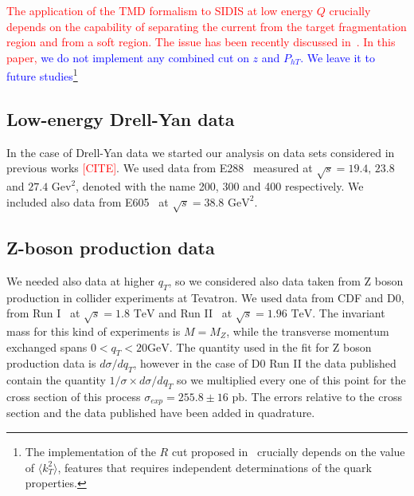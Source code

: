 \documentclass[aps,preprintnumbers,showpacs,nofootinbib,superscriptaddress,floatfix]{revtex4}
\begin{document}
\textcolor{red}{The application of the TMD formalism to SIDIS at low energy $Q$ crucially depends on the capability of separating the current from the target fragmentation region and from a soft region. The issue has been recently discussed in~\cite{Boglione:2016bph}. In this paper, }
\textcolor{blue}{we do not implement any combined cut on $z$ and $P_{hT}$. We leave it to future studies\footnote{The implementation of the $R$ cut proposed in~\cite{Boglione:2016bph} crucially depends on the value of $\langle k_T^2 \rangle$, features that requires independent determinations of the quark properties.}}

\subsection{Low-energy Drell-Yan data}
\label{ss:dy}

In the case of Drell-Yan data we started our analysis on data sets considered in previous works \textcolor{red}{[CITE]}. We used data from E288~\cite{Ito:1980ev} measured at $\sqrt{s}=19.4,\,23.8$ and $27.4\text{ Gev}^2$, denoted with the name 200, 300 and 400 respectively. We included also data from E605~\cite{Moreno:1990sf} at $\sqrt{s}=38.8 \text{ GeV}^2$.

\subsection{Z-boson production data}
\label{ss:zboson}

We needed also data at higher $q_T$, so we considered also data taken from Z boson production in collider experiments at Tevatron.  We used data from CDF and D0, from Run I~\cite{Affolder:1999jh,Abbott:1999wk} at $\sqrt{s}=1.8\text{ TeV}$ and Run II~\cite{Aaltonen:2012fi,Abazov:2007ac} at $\sqrt{s}=1.96\text{ TeV}$. The invariant mass for this kind of experiments is $M=M_Z$, while the transverse momentum exchanged spans $0< q_T < 20 \text{GeV}$.
The quantity used in the fit for Z boson production data is $d\sigma /dq_T$,  however in the case of D0 Run II the data published contain the quantity $1/\sigma \times d\sigma/dq_T$ so we multiplied every one of this point for the cross section of this process $\sigma_{exp} = 255.8 \pm 16 \text{ pb}$. The errors relative to the cross section and the data published have been added in quadrature.\\
\end{document}
